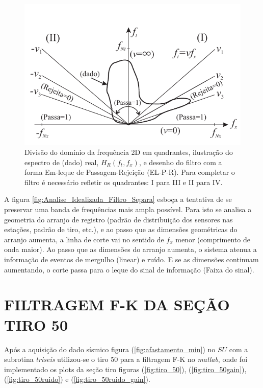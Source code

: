 \begin{figure}[H]
\centering
\includegraphics[width=12cm]{figuras/cap3/Filtro_velocidade.pdf}
\vspace{-0.3cm}
\caption{Divisão do domínio da frequência 2D em quadrantes, ilustração do espectro de (dado) real, $H_{R}(f_{t},f_{x})$, e desenho do filtro com a forma Em-leque de Passagem-Rejeição (EL-P-R). 
Para completar o filtro é necessário refletir os quadrantes: I para III e II para IV.}
\label{fig:Filtro_velocidade}
\end{figure}

A figura \ref{fig:Analise_Idealizada_Filtro_Separa} esboça a tentativa de se preservar uma banda de frequências mais ampla possível. 
Para isto se analisa a geometria do arranjo de registro (padrão de distribuição dos sensores nas estações, padrão de tiro, etc.), e ao passo que as dimensões geométricas do arranjo aumenta, a linha de corte vai no sentido de $f_{x}$ menor (comprimento de onda maior). 
Ao passo que as dimensões do arranjo aumenta, o sistema atenua a informação de eventos de mergulho (linear) e ruído.
E se as dimensões continuam aumentando, o corte passa para o leque do sinal de informação (Faixa do sinal).

\section{FILTRAGEM F-K DA SEÇÃO TIRO 50}

Após a aquisição do dado sísmico figura (\ref{fig:afastamento_min}) no $SU$ com a subrotina \textit{triseis} utilizou-se o tiro $50$ para a filtragem F-K no \textit{matlab}, onde foi implementado os plots da seção tiro figuras (\ref{fig:tiro_50}), (\ref{fig:tiro_50gain}), (\ref{fig:tiro_50ruido}) e (\ref{fig:tiro_50ruido_gain}). 

